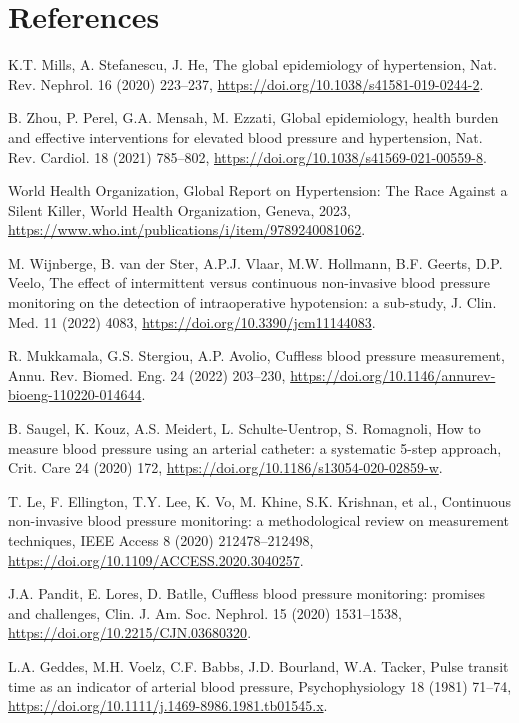 \documentclass[preprint,12pt]{elsarticle}
\begin{document}
\section*{References}
\small
\sloppy
\begin{enumerate}[label={[\arabic*]},leftmargin=2.2em]
\item K.T. Mills, A. Stefanescu, J. He, The global epidemiology of hypertension, Nat. Rev. Nephrol. 16 (2020) 223--237, \url{https://doi.org/10.1038/s41581-019-0244-2}.
\item B. Zhou, P. Perel, G.A. Mensah, M. Ezzati, Global epidemiology, health burden and effective interventions for elevated blood pressure and hypertension, Nat. Rev. Cardiol. 18 (2021) 785--802, \url{https://doi.org/10.1038/s41569-021-00559-8}.
\item World Health Organization, Global Report on Hypertension: The Race Against a Silent Killer, World Health Organization, Geneva, 2023, \url{https://www.who.int/publications/i/item/9789240081062}.
\item M. Wijnberge, B. van der Ster, A.P.J. Vlaar, M.W. Hollmann, B.F. Geerts, D.P. Veelo, The effect of intermittent versus continuous non-invasive blood pressure monitoring on the detection of intraoperative hypotension: a sub-study, J. Clin. Med. 11 (2022) 4083, \url{https://doi.org/10.3390/jcm11144083}.
\item R. Mukkamala, G.S. Stergiou, A.P. Avolio, Cuffless blood pressure measurement, Annu. Rev. Biomed. Eng. 24 (2022) 203--230, \url{https://doi.org/10.1146/annurev-bioeng-110220-014644}.
\item B. Saugel, K. Kouz, A.S. Meidert, L. Schulte-Uentrop, S. Romagnoli, How to measure blood pressure using an arterial catheter: a systematic 5-step approach, Crit. Care 24 (2020) 172, \url{https://doi.org/10.1186/s13054-020-02859-w}.
\item T. Le, F. Ellington, T.Y. Lee, K. Vo, M. Khine, S.K. Krishnan, et al., Continuous non-invasive blood pressure monitoring: a methodological review on measurement techniques, IEEE Access 8 (2020) 212478--212498, \url{https://doi.org/10.1109/ACCESS.2020.3040257}.
\item J.A. Pandit, E. Lores, D. Batlle, Cuffless blood pressure monitoring: promises and challenges, Clin. J. Am. Soc. Nephrol. 15 (2020) 1531--1538, \url{https://doi.org/10.2215/CJN.03680320}.
\item L.A. Geddes, M.H. Voelz, C.F. Babbs, J.D. Bourland, W.A. Tacker, Pulse transit time as an indicator of arterial blood pressure, Psychophysiology 18 (1981) 71--74, \url{https://doi.org/10.1111/j.1469-8986.1981.tb01545.x}.

\end{enumerate}
\end{document}
